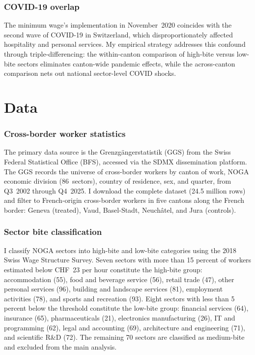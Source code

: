 \documentclass[12pt]{article}
\begin{document}
\subsubsection*{COVID-19 overlap} The minimum wage's implementation in November~2020 coincides with the second wave of COVID-19 in Switzerland, which disproportionately affected hospitality and personal services. My empirical strategy addresses this confound through triple-differencing: the within-canton comparison of high-bite versus low-bite sectors eliminates canton-wide pandemic effects, while the across-canton comparison nets out national sector-level COVID shocks.


\section{Data}
\label{sec:data}

\subsubsection*{Cross-border worker statistics} The primary data source is the Grenzg\"angerstatistik (GGS) from the Swiss Federal Statistical Office (BFS), accessed via the SDMX dissemination platform. The GGS records the universe of cross-border workers by canton of work, NOGA economic division (86~sectors), country of residence, sex, and quarter, from Q3~2002 through Q4~2025. I download the complete dataset (24.5 million rows) and filter to French-origin cross-border workers in five cantons along the French border: Geneva (treated), Vaud, Basel-Stadt, Neuch\^atel, and Jura (controls).

\subsubsection*{Sector bite classification} I classify NOGA sectors into high-bite and low-bite categories using the 2018 Swiss Wage Structure Survey. Seven sectors with more than 15 percent of workers estimated below CHF~23 per hour constitute the high-bite group: accommodation (55), food and beverage service (56), retail trade (47), other personal services (96), building and landscape services (81), employment activities (78), and sports and recreation (93). Eight sectors with less than 5 percent below the threshold constitute the low-bite group: financial services (64), insurance (65), pharmaceuticals (21), electronics manufacturing (26), IT and programming (62), legal and accounting (69), architecture and engineering (71), and scientific R\&D (72). The remaining 70 sectors are classified as medium-bite and excluded from the main analysis.
\end{document}
